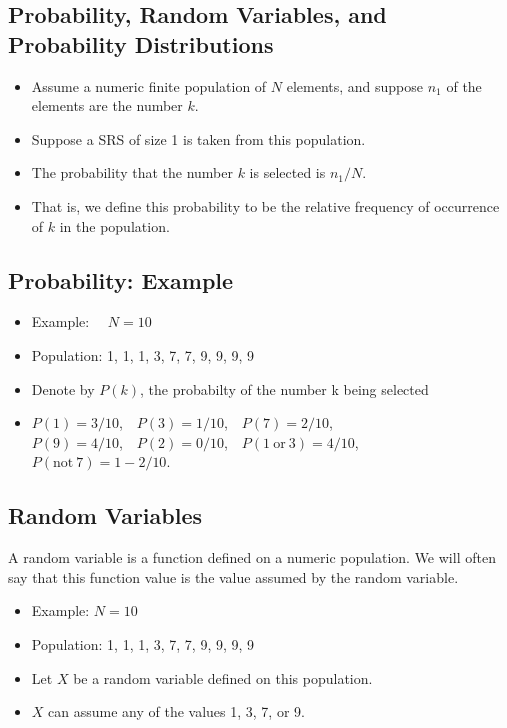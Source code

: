 \documentclass[
  letterpaper,
  DIV=11,
  numbers=noendperiod]{scrartcl}
\begin{document}
\subsection{Probability, Random Variables, and Probability
Distributions}\label{probability-random-variables-and-probability-distributions}

\begin{itemize}
\item
  Assume a numeric finite population of \(N\) elements, and suppose
  \(n_1\) of the elements are the number \(k\).
\item
  Suppose a SRS of size 1 is taken from this population.
\item
  The {probability} that the number \(k\) is selected is \(n_1/N\).
\item
  That is, we define this probability to be the relative frequency of
  occurrence of \(k\) in the population.
\end{itemize}

\subsection{Probability: Example}\label{probability-example}

\begin{itemize}
\item
  {Example:} ~~\(N = 10\)
\item
  {Population}: 1, 1, 1, 3, 7, 7, 9, 9, 9, 9
\item
  Denote by \(P(k)\), {the probabilty of the number k being selected}
\item
  \(P(1) = 3/10\),~~\(P(3) = 1/10\),~~\(P(7) = 2/10\),\\
  \(P(9) = 4/10\),~~\(P(2) = 0/10\),~~\(P(1~\mbox{or}~3) = 4/10\),\\
  \(P(\mbox{not}~7) = 1-2/10\).
\end{itemize}

\subsection{Random Variables}\label{random-variables}

A {random variable} is a function defined on a numeric population. We
will often say that this function value is {the value assumed by the
random variable}.

\begin{itemize}
\item
  {Example}: \(N = 10\)
\item
  {Population}: 1, 1, 1, 3, 7, 7, 9, 9, 9, 9
\item
  Let \(X\) be a random variable defined on this population.
\item
  \(X\) can assume any of the values 1, 3, 7, or 9.
\end{itemize}
\end{document}
